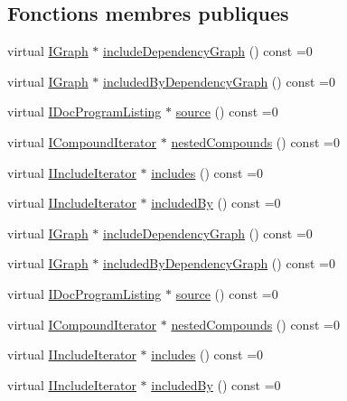 \subsection*{Fonctions membres publiques}
\begin{DoxyCompactItemize}
\item 
virtual \hyperlink{class_i_graph}{I\+Graph} $\ast$ \hyperlink{class_i_file_af6c7b3cbc791250f3145783822fbbb0a}{include\+Dependency\+Graph} () const  =0
\item 
virtual \hyperlink{class_i_graph}{I\+Graph} $\ast$ \hyperlink{class_i_file_ad7b8923bb517e544ec315012ed8a59ba}{included\+By\+Dependency\+Graph} () const  =0
\item 
virtual \hyperlink{class_i_doc_program_listing}{I\+Doc\+Program\+Listing} $\ast$ \hyperlink{class_i_file_ad635fa8d7ffbd29d19da112eb71c48ac}{source} () const  =0
\item 
virtual \hyperlink{class_i_compound_iterator}{I\+Compound\+Iterator} $\ast$ \hyperlink{class_i_file_a1fba74a8e86efa650d94717fc213ffae}{nested\+Compounds} () const  =0
\item 
virtual \hyperlink{class_i_include_iterator}{I\+Include\+Iterator} $\ast$ \hyperlink{class_i_file_a1366d88cd7f08d69f281c61ba6087bbd}{includes} () const  =0
\item 
virtual \hyperlink{class_i_include_iterator}{I\+Include\+Iterator} $\ast$ \hyperlink{class_i_file_ac6ac8a3be19077a4450f0f092b4b9895}{included\+By} () const  =0
\item 
virtual \hyperlink{class_i_graph}{I\+Graph} $\ast$ \hyperlink{class_i_file_af6c7b3cbc791250f3145783822fbbb0a}{include\+Dependency\+Graph} () const  =0
\item 
virtual \hyperlink{class_i_graph}{I\+Graph} $\ast$ \hyperlink{class_i_file_ad7b8923bb517e544ec315012ed8a59ba}{included\+By\+Dependency\+Graph} () const  =0
\item 
virtual \hyperlink{class_i_doc_program_listing}{I\+Doc\+Program\+Listing} $\ast$ \hyperlink{class_i_file_ad635fa8d7ffbd29d19da112eb71c48ac}{source} () const  =0
\item 
virtual \hyperlink{class_i_compound_iterator}{I\+Compound\+Iterator} $\ast$ \hyperlink{class_i_file_a1fba74a8e86efa650d94717fc213ffae}{nested\+Compounds} () const  =0
\item 
virtual \hyperlink{class_i_include_iterator}{I\+Include\+Iterator} $\ast$ \hyperlink{class_i_file_a1366d88cd7f08d69f281c61ba6087bbd}{includes} () const  =0
\item 
virtual \hyperlink{class_i_include_iterator}{I\+Include\+Iterator} $\ast$ \hyperlink{class_i_file_ac6ac8a3be19077a4450f0f092b4b9895}{included\+By} () const  =0
\end{DoxyCompactItemize}
